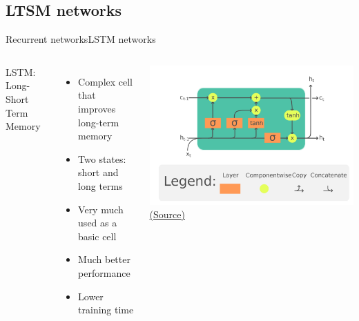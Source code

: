 \documentclass[10pt,compress]{beamer} %
\begin{document}
\subsection{LTSM networks}
\begin{frame}{Recurrent networks}{LSTM networks}
    \begin{columns}
            LSTM: Long-Short Term Memory
            \begin{itemize}
                \item Complex cell that improves long-term memory
                \item Two states: short and long terms
                \item Very much used as a basic cell
                \item Much better performance
                \item Lower training time
            \end{itemize}
            \centering \includegraphics[width=\textwidth]{figs/LTSM.png}\\
	        \scriptsize\href{https://en.wikipedia.org/wiki/Long_short-term_memory}{(Source)}
    \end{columns}
\end{frame}
\end{document}
